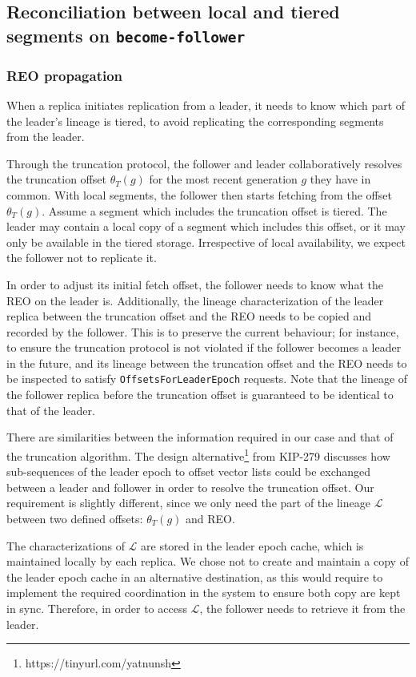 \documentclass{article}
\newcommand*\circled[1]{\tikz[baseline=(char.base)]{
		\node[shape=circle,draw,inner sep=1pt] (char) {#1};}}
\begin{document}
\subsection{Reconciliation between local and tiered segments on \texttt{become-follower}}

\subsubsection{REO propagation}

When a replica initiates replication from a leader, it needs to know which part of the leader's lineage is tiered, to avoid replicating the corresponding segments from the leader.

Through the truncation protocol, the follower and leader collaboratively resolves the truncation offset $\theta_T(g)$ for the most recent generation $g$ they have in common. With local segments, the follower then starts fetching from the offset $\theta_T(g)$. Assume a segment which includes the truncation offset is tiered. The leader may contain a local copy of a segment which includes this offset, or it may only be available in the tiered storage. Irrespective of local availability, we expect the follower not to replicate it.

In order to adjust its initial fetch offset, the follower needs to know what the REO on the leader is. Additionally, the lineage characterization of the leader replica between the truncation offset and the REO needs to be copied and recorded by the follower. This is to preserve the current behaviour; for instance, to ensure the truncation protocol is not violated if the follower becomes a leader in the future, and its lineage between the truncation offset and the REO needs to be inspected to satisfy \texttt{OffsetsForLeaderEpoch} requests. Note that the lineage of the follower replica before the truncation offset is guaranteed to be identical to that of the leader.

There are similarities between the information required in our case and that of the truncation algorithm. The design alternative\footnote{https://tinyurl.com/yatnunsh} \circled{2} from KIP-279 \cite{KIP279} discusses how sub-sequences of the leader epoch to offset vector lists could be exchanged between a leader and follower in order to resolve the truncation offset. Our requirement is slightly different, since we only need the part of the lineage $\mathcal{L}$ between two defined offsets: $\theta_T(g)$ and REO.

The characterizations of $\mathcal{L}$ are stored in the leader epoch cache, which is maintained locally by each replica. We chose not to create and maintain a copy of the leader epoch cache in an alternative destination, as this would require to implement the required coordination in the system to ensure both copy are kept in sync. Therefore, in order to access $\mathcal{L}$, the follower needs to retrieve it from the leader.
\end{document}
